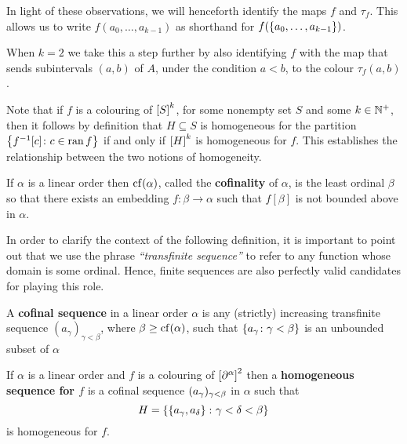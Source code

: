 \begin{conv}[Colourings]\label{rem:Col}
	In light of these observations, we will henceforth identify the maps $f$ and
	$\tau_f$.  This allows us to write $f(a_0,\dotsc,a_{k-1})$ as
	shorthand for $f(\set{a_0,\dotsc,a_{k-1}})$.

	When $k=2$ we take this a step further by also identifying $f$ with the map
	that sends subintervals $(a,b)$ of $A$, under the condition $a<b$, to the
	colour $\tau_f(a,b)$.
\end{conv}

\begin{rem}[Homogeneity]\label{rem:hom}
	Note that if $f$ is a colouring of $\subsets{k}{S}$, for some nonempty set
	$S$ and some $k\in\posnats$, then it follows by definition that $H\subseteq
	S$ is homogeneous for the partition $\setbuild{f^{-1}[c]}{c\in\range f}$ if
	and only if $\subsets{k}{H}$ is homogeneous for $f$.  This establishes the
	relationship between the two notions of homogeneity.
\end{rem}


\begin{dfn}[Cofinality]
	If $\alpha$ is a linear order then $\cf(\alpha)$, called the
	\textbf{cofinality} of $\alpha$, is the least ordinal $\beta$ so that there
	exists an embedding $f\colon\beta\to\alpha$ such that $f[\beta]$ is not
	bounded above in $\alpha$.
\end{dfn}

In order to clarify the context of the following definition, it is important to
point out that we use the phrase \textit{``transfinite sequence''} to refer to
any function whose domain is some ordinal.  Hence, finite sequences are also
perfectly valid candidates for playing this role.

\begin{dfn}
	A \textbf{cofinal sequence} in a linear order $\alpha$ is any (strictly)
	increasing transfinite sequence $(a_\gamma)_{\gamma<\beta}$, where
	$\beta\geq\cf(\alpha)$, such that $\setbuild{a_\gamma}{\gamma<\beta}$ is an
	unbounded subset of $\alpha$
\end{dfn}

\begin{dfn}
	If $\alpha$ is a linear order and $f$ is a colouring of
	$\subsets{2}{\domain\alpha}$ then a \textbf{homogeneous sequence for $f$}
	is a cofinal sequence $\family{a_\gamma}{\gamma<\beta}$ in $\alpha$ such
	that
	\begin{equation}
		H=\setbuild{\set{a_\gamma,a_\delta}}{\gamma<\delta<\beta}
	\end{equation}
	is homogeneous for $f$.
\end{dfn}

